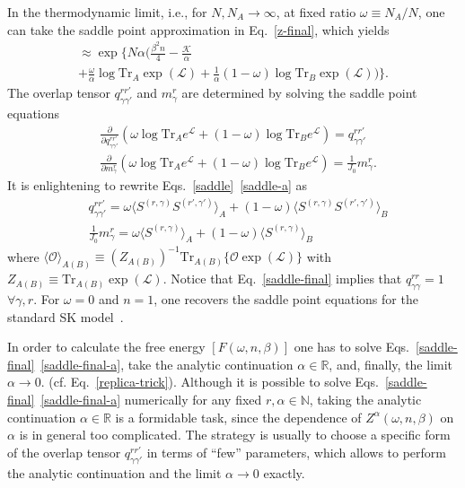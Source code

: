 \documentclass[twocolumn,superscriptaddress,prb,10pt]{revtex4-1}
\def\tr{\textrm{Tr}}
\begin{document}
In the thermodynamic limit, i.e., for $N,N_A\to\infty$, at fixed ratio 
$\omega\equiv N_A/N$, one can take the saddle point approximation in 
Eq.~\eqref{z-final}, which yields   
%
\begin{multline}
[Z^\alpha(\omega,n,\beta)]\approx
\exp\Big\{N\alpha\Big(\frac{\beta^2n}{4}-\frac{\mathcal K}{\alpha}\\
+\frac{\omega}{\alpha}\log\tr_A\exp({\mathcal L})+
\frac{1}{\alpha}(1-\omega)\log\tr_B\exp({\mathcal L})
\Big)\Big\}. 
\label{Z-ac}
\end{multline}
%
The overlap tensor $q_{\gamma\gamma'}^{rr'}$ and $m_\gamma^r$ are 
determined by solving the saddle point equations 
%
\begin{align}
\label{saddle}
& \frac{\partial}{\partial q_{\gamma\gamma'}^{rr'}}
\left(\omega\log\tr_A e^{{\mathcal L}}+(1-\omega)\log\tr_B 
e^{{\mathcal L}}\right)=q_{\gamma\gamma'}^{rr'}\\
\label{saddle-a}
& \frac{\partial}{\partial m_\gamma^r}\left(\omega\log\tr_A 
e^{{\mathcal L}}+(1-\omega)\log\tr_B e^{{\mathcal L}}\right)=
\frac{1}{J_0}m_\gamma^r.
\end{align}
%
It is enlightening to rewrite Eqs.~\eqref{saddle}~\eqref{saddle-a} as 
%
\begin{align}
\label{saddle-final}
& q_{\gamma\gamma'}^{rr'}=
\omega\langle S^{(r,\gamma)} S^{(r',\gamma')}\rangle_A+
(1-\omega)\langle S^{(r,\gamma)}S^{(r',\gamma')}
\rangle_B\\
& \frac{1}{J_0}m_\gamma^r=\omega\langle S^{(r,\gamma)}
\rangle_A+(1-\omega)\langle S^{(r,\gamma)}
\rangle_B
\label{saddle-final-a}
\end{align}
%
where $\langle {\mathcal O}\rangle_{A(B)}\equiv (Z_{A(B)})^{-1}
\tr_{A(B)}\{{\mathcal O}\exp({\mathcal L})\}$ with $Z_{A(B)}\equiv\tr_{A(B)}
\exp({\mathcal L})$. Notice that Eq.~\eqref{saddle-final} implies 
that $q_{\gamma\gamma}^{rr}=1$ $\forall\gamma,r$. For $\omega=0$ and $n=1$, 
one recovers the saddle point equations for the standard SK model~\cite{parisi-book,
nishimori-book}. 

In order to calculate the free energy $[F(\omega,n,\beta)]$ one has to solve 
Eqs.~\eqref{saddle-final}~\eqref{saddle-final-a}, take the analytic continuation 
$\alpha\in\mathbb{R}$, and, finally, the limit $\alpha\to 0$.  
(cf. Eq.~\eqref{replica-trick}). Although it is possible to solve 
Eqs.~\eqref{saddle-final}~\eqref{saddle-final-a} numerically for any fixed $r,
\alpha\in\mathbb{N}$, taking the analytic continuation $\alpha\in\mathbb{R}$ is a 
formidable task, since the dependence of $Z^\alpha(\omega,n,\beta)$ on $\alpha$ is in 
general too complicated. The strategy is usually to choose a specific 
form of the overlap tensor $q_{\gamma\gamma'}^{rr'}$ in terms of ``few'' 
parameters, which allows to perform the analytic continuation and the limit 
$\alpha\to 0$ exactly. 
\end{document}
